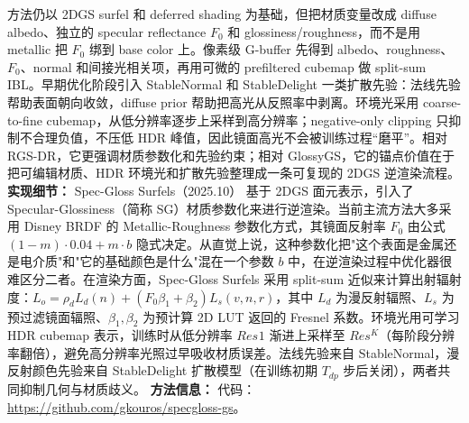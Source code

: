 方法仍以 2DGS surfel 和 deferred shading 为基础，但把材质变量改成 diffuse albedo、独立的 specular reflectance $F_0$ 和 glossiness/roughness，而不是用 metallic 把 $F_0$ 绑到 base color 上。像素级 G-buffer 先得到 albedo、roughness、$F_0$、normal 和间接光相关项，再用可微的 prefiltered cubemap 做 split-sum IBL。早期优化阶段引入 StableNormal 和 StableDelight 一类扩散先验：法线先验帮助表面朝向收敛，diffuse prior 帮助把高光从反照率中剥离。环境光采用 coarse-to-fine cubemap，从低分辨率逐步上采样到高分辨率；negative-only clipping 只抑制不合理负值，不压低 HDR 峰值，因此镜面高光不会被训练过程“磨平”。相对 RGS-DR，它更强调材质参数化和先验约束；相对 GlossyGS，它的锚点价值在于把可编辑材质、HDR 环境光和扩散先验整理成一条可复现的 2DGS 逆渲染流程。
\textbf{实现细节：} Spec-Gloss Surfels（2025.10） 基于 2DGS 面元表示，引入了 Specular-Glossiness（简称 SG）材质参数化来进行逆渲染。当前主流方法大多采用 Disney BRDF 的 Metallic-Roughness 参数化方式，其镜面反射率 $F_0$ 由公式 $(1-m)\cdot 0.04 + m\cdot b$ 隐式决定。从直觉上说，这种参数化把"这个表面是金属还是电介质"和"它的基础颜色是什么"混在一个参数 $b$ 中，在逆渲染过程中优化器很难区分二者。在渲染方面，Spec-Gloss Surfels 采用 split-sum 近似来计算出射辐射度：$L_o = \rho_d L_d(n) + (F_0 \beta_1 + \beta_2) L_s(v,n,r)$，其中 $L_d$ 为漫反射辐照、$L_s$ 为预过滤镜面辐照、$\beta_1,\beta_2$ 为预计算 2D LUT 返回的 Fresnel 系数。环境光用可学习 HDR cubemap 表示，训练时从低分辨率 $Res^{}1$ 渐进上采样至 $Res^K$（每阶段分辨率翻倍），避免高分辨率光照过早吸收材质误差。法线先验来自 StableNormal，漫反射颜色先验来自 StableDelight 扩散模型（在训练初期 $T_{dp}$ 步后关闭），两者共同抑制几何与材质歧义。
\textbf{方法信息：} 代码：\url{https://github.com/gkouros/specgloss-gs}。

